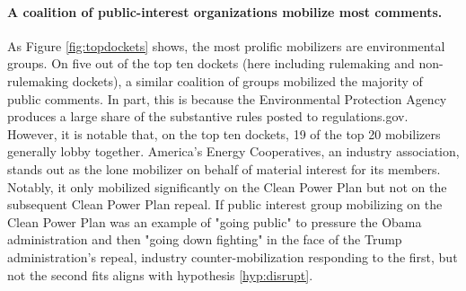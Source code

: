 \paragraph{A coalition of public-interest organizations mobilize most comments.} As Figure \ref{fig:topdockets} %
shows, the most prolific mobilizers are environmental groups. On five out of the top ten dockets (here including rulemaking and non-rulemaking dockets), a similar coalition of groups mobilized the majority of public comments. In part, this is because the Environmental Protection Agency produces a large share of the substantive rules posted to regulations.gov. However, it is notable that, on the top ten dockets, 19 of the top 20 mobilizers generally lobby together. America's Energy Cooperatives, an industry association, stands out as the lone mobilizer on behalf of material interest for its members. Notably, it only mobilized significantly on the Clean Power Plan but not on the subsequent Clean Power Plan repeal. If public interest group mobilizing on the Clean Power Plan was an example of "going public" to pressure the Obama administration and then "going down fighting" in the face of the Trump administration's repeal, industry counter-mobilization responding to the first, but not the second fits aligns with hypothesis \ref{hyp:disrupt}.  